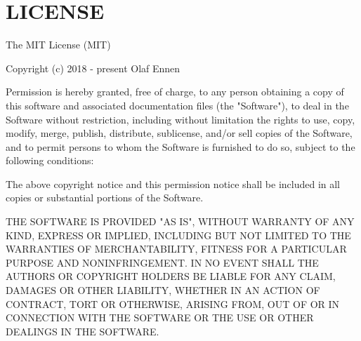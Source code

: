 \chapter{LICENSE}
\hypertarget{md_node__modules_2natural-orderby_2_l_i_c_e_n_s_e}{}\label{md_node__modules_2natural-orderby_2_l_i_c_e_n_s_e}
The MIT License (MIT)

Copyright (c) 2018 -\/ present Olaf Ennen

Permission is hereby granted, free of charge, to any person obtaining a copy of this software and associated documentation files (the "{}\+Software"{}), to deal in the Software without restriction, including without limitation the rights to use, copy, modify, merge, publish, distribute, sublicense, and/or sell copies of the Software, and to permit persons to whom the Software is furnished to do so, subject to the following conditions\+:

The above copyright notice and this permission notice shall be included in all copies or substantial portions of the Software.

THE SOFTWARE IS PROVIDED "{}\+AS IS"{}, WITHOUT WARRANTY OF ANY KIND, EXPRESS OR IMPLIED, INCLUDING BUT NOT LIMITED TO THE WARRANTIES OF MERCHANTABILITY, FITNESS FOR A PARTICULAR PURPOSE AND NONINFRINGEMENT. IN NO EVENT SHALL THE AUTHORS OR COPYRIGHT HOLDERS BE LIABLE FOR ANY CLAIM, DAMAGES OR OTHER LIABILITY, WHETHER IN AN ACTION OF CONTRACT, TORT OR OTHERWISE, ARISING FROM, OUT OF OR IN CONNECTION WITH THE SOFTWARE OR THE USE OR OTHER DEALINGS IN THE SOFTWARE. 